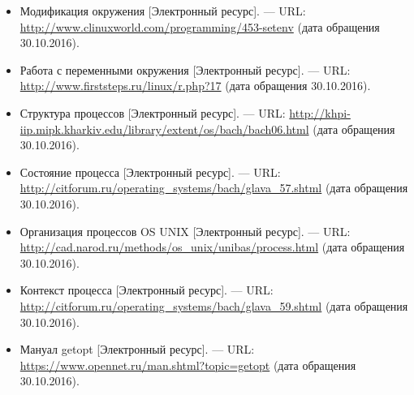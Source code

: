 \documentclass[14pt,a4paper,report]{report}
\begin{document}
\begin{itemize}
	\item Модификация окружения [Электронный ресурс]. — URL: \href{http://www.clinuxworld.com/programming/453-setenv}{http://www.clinuxworld.com/programming/453-setenv} (дата обращения 30.10.2016).
	
	\item Работа с переменными окружения [Электронный ресурс]. — URL: \href{http://www.firststeps.ru/linux/r.php?17}{http://www.firststeps.ru/linux/r.php?17} (дата обращения 30.10.2016).
	
	\item Структура процессов [Электронный ресурс]. — URL: \href{http://khpi-iip.mipk.kharkiv.edu/library/extent/os/bach/bach06.html}{http://khpi-iip.mipk.kharkiv.edu/library/extent/os/ba\linebreak ch/bach06.html} (дата обращения 30.10.2016).
	
	\item Состояние процесса [Электронный ресурс]. — URL: \href{http://citforum.ru/operating_systems/bach/glava_57.shtml}{http://citforum.ru/operating\_systems/bach/glava\_57.s\linebreak html} (дата обращения 30.10.2016).
	
	\item Организация процессов OS UNIX [Электронный ресурс]. — URL: \href{http://cad.narod.ru/methods/os_unix/unibas/process.html}{http://cad.narod.ru/methods/os\_unix/un\linebreak ibas/process.html} (дата обращения 30.10.2016).
	
	\item Контекст процесса [Электронный ресурс]. — URL: \href{http://citforum.ru/operating_systems/bach/glava_59.shtml}{http://citforum.ru/operating\_systems/bach/glava\_59.sh\linebreak tml} (дата обращения 30.10.2016).
	
	\item Мануал getopt [Электронный ресурс]. — URL: \href{https://www.opennet.ru/man.shtml?topic=getopt}{https://www.opennet.ru/man.shtml?topic=getopt} (дата обращения 30.10.2016).
\end{itemize}
\end{document}
